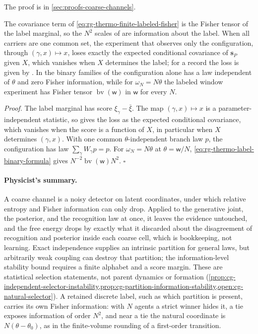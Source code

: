 The proof is in \cref{sec:proofs-coarse-channels}.

The covariance term of \eqref{eq:rg-thermo-finite-labeled-fisher} is the Fisher tensor of the label
marginal, so the $N^2$ scales of 
are information about the label. When all carriers are one common set, the experiment that observes
only the configuration, through $(\gamma,x)\mapsto x$, loses exactly the expected conditional
covariance of $\mathbf s_P$ given $X$, which vanishes when $X$ determines the label; for a record
the loss is given by . In the binary families of
 the configuration alone has a law independent of
$\theta$ and zero Fisher information, while for $\omega_N=N\theta$ the labeled window experiment has
Fisher tensor $\operatorname{bv}(\mathsf w)$ in $\mathsf w$ for every $N$. 

\noindent\emph{Proof.}
The label marginal has score $\xi_\gamma-\bar\xi$. The map $(\gamma,x)\mapsto x$ is a
parameter-independent statistic, so  gives the loss as the expected
conditional covariance, which vanishes when the score is a function of $X$, in particular when $X$
determines $(\gamma,x)$. With one common $\theta$-independent branch law $p$, the configuration has
law $\sum_\gamma W_\gamma p=p$. For $\omega_N=N\theta$ at $\theta=\mathsf w/N$,
\eqref{eq:rg-thermo-label-binary-formula} gives $N^{-2}\operatorname{bv}(\mathsf w)N^2$. $\square$

\paragraph{Physicist's summary.}
A coarse channel is a noisy detector on latent coordinates, under which relative entropy and Fisher
information can only drop. Applied to the generative joint, the posterior, and the recognition law at
once, it leaves the evidence untouched, and the free energy drops by exactly what it discarded about
the disagreement of recognition and posterior inside each coarse cell, which is bookkeeping, not
learning. Exact independence supplies an intrinsic partition for general laws, but arbitrarily weak
coupling can destroy that partition; the information-level stability bound requires a finite alphabet
and a score margin. These are statistical selection statements, not parent dynamics or formation
(\cref{prop:cg-independent-selector-instability,prop:cg-partition-information-stability,open:cg-natural-selector}). A retained discrete label, such as which partition is present, carries its own Fisher
information: with $N$ agents a strict winner hides it, a tie exposes information of order $N^2$, and
near a tie the natural coordinate is $N(\theta-\theta_0)$, as in the finite-volume rounding of a
first-order transition.
